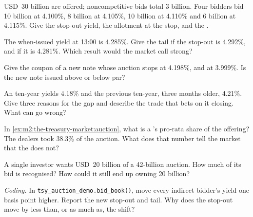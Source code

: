 \begin{exercise}[$\star$]\label{exo:m2:the-treasury-market:1}
USD~30 billion are offered; noncompetitive bids total 3 billion. Four bidders
bid 10 billion at 4.100\%, 8 billion at 4.105\%, 10 billion at 4.110\% and 6
billion at 4.115\%. Give the stop-out yield, the allotment at the stop, and
the .
\end{exercise}

\begin{exercise}[$\star$]\label{exo:m2:the-treasury-market:2}
The when-issued yield at 13:00 is 4.285\%. Give the tail if the stop-out is
4.292\%, and if it is 4.281\%. Which result would the market call strong?
\end{exercise}

\begin{exercise}[$\star$]\label{exo:m2:the-treasury-market:3}
Give the coupon of a new note whose auction stops at 4.198\%, and at 3.999\%.
Is the new note issued above or below par?
\end{exercise}

\begin{exercise}[$\star\star$]\label{exo:m2:the-treasury-market:4}
An  ten-year yields 4.18\% and the previous ten-year, three months
older, 4.21\%. Give three reasons for the gap and describe the trade that
bets on it closing. What can go wrong?
\end{exercise}

\begin{exercise}[$\star\star$]\label{exo:m2:the-treasury-market:5}
In \cref{ex:m2:the-treasury-market:auction}, what is a 's
pro-rata share of the offering? The dealers took 38.3\% of the auction. What
does that number tell the market that the  does not?
\end{exercise}

\begin{exercise}[$\star\star$]\label{exo:m2:the-treasury-market:6}
A single investor wants USD~20 billion of a 42-billion auction. How much of its
bid is recognised? How could it still end up owning 20 billion?
\end{exercise}

\begin{exercise}[$\star\star\star$]\label{exo:m2:the-treasury-market:7}
\emph{Coding.} In \texttt{tsy\_auction\_demo.bid\_book()}, move every indirect
bidder's yield one basis point higher. Report the new stop-out and tail. Why
does the stop-out move by less than, or as much as, the shift?
\end{exercise}

